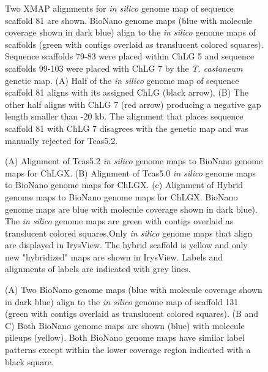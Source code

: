 \documentclass{bmcart}
\begin{document}
\begin{backmatter}
\begin{figure}[h!]
      \end{figure}                      
\begin{figure}[h!]
	\caption{
		Two XMAP alignments for \textit{in silico} genome map of sequence scaffold 81 are shown. BioNano genome maps (blue with molecule coverage shown in dark blue) align to the \textit{in silico} genome maps of scaffolds (green with contigs overlaid as translucent colored squares). Sequence scaffolds 79-83 were placed within ChLG 5 and sequence scaffolds 99-103 were placed with ChLG 7 by the \textit{T. castaneum} genetic map. (A) Half of the \textit{in silico} genome map of sequence scaffold 81 aligns with its assigned ChLG (black arrow). (B) The other half aligns with ChLG 7 (red arrow) producing a negative gap length smaller than -20 kb. The alignment that places sequence scaffold 81 with ChLG 7 disagrees with the genetic map and was manually rejected for Tcas5.2.}
      \end{figure} 

\begin{figure}[h!]
	\caption{
		(A) Alignment of Tcas5.2 \textit{in silico} genome maps to BioNano genome maps for ChLGX. (B) Alignment of Tcas5.0 \textit{in silico} genome maps to BioNano genome maps for ChLGX. (c) Alignment of Hybrid genome maps to BioNano genome maps for ChLGX. BioNano genome maps are blue with molecule coverage shown in dark blue). The \textit{in silico} genome maps are green with contigs overlaid as translucent colored squares.Only \textit{in silico} genome maps that align are displayed in IrysView. The hybrid scaffold is yellow and only new "hybridized" maps are shown in IrysView. Labels and alignments of labels are indicated with grey lines. }
      \end{figure}  
\begin{figure}[h!]
	\caption{
		(A) Two BioNano genome maps (blue with molecule coverage shown in dark blue) align to the \textit{in silico} genome map of scaffold 131 (green with contigs overlaid as translucent colored squares). (B and C) Both BioNano genome maps are shown (blue) with molecule pileups (yellow). Both BioNano genome maps have similar label patterns except within the lower coverage region indicated with a black square.}
\end{figure}            



\end{backmatter}
\end{document}
